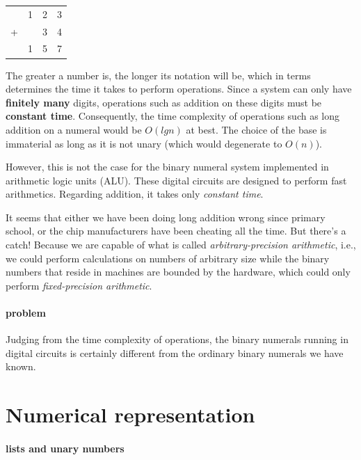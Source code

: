 \documentclass[\main/thesis.tex]{subfiles}
\begin{document}
\begin{center}
    \begin{tabular}{c@{\,}c@{\,}c@{\,}c}
      & 1 & 2 & 3 \\
    + &   & 3 & 4 \\
    \hline
      & 1 & 5 & 7 \\
    \end{tabular}
\end{center}

The greater a number is, the longer its notation will be, which in terms
determines the time it takes to perform operations.
Since a system can only have \textbf{finitely many} digits, operations such as
addition on these digits must be \textbf{constant time}.
Consequently, the time complexity of operations such as long addition on a
numeral would be $ O(lg n) $ at best.
The choice of the base is immaterial as long as it is not unary
(which would degenerate to $ O(n) $).

However, this is not the case for the binary numeral system implemented in
arithmetic logic units (ALU). These digital circuits are designed to perform
fast arithmetics. Regarding addition, it takes only \textit{constant time}.

It seems that either we have been doing long addition wrong since primary school,
or the chip manufacturers have been cheating all the time. But there's a catch!
Because we are capable of what is called \textit{arbitrary-precision arithmetic},
i.e., we could perform calculations on numbers of arbitrary size
while the binary numbers that reside in machines are bounded by the hardware,
which could only perform \textit{fixed-precision arithmetic}.

\paragraph{problem}
Judging from the time complexity of operations, the binary numerals running in
digital circuits is certainly different from the ordinary binary numerals we have
known.

\section{Numerical representation}

\paragraph{lists and unary numbers}
\end{document}
